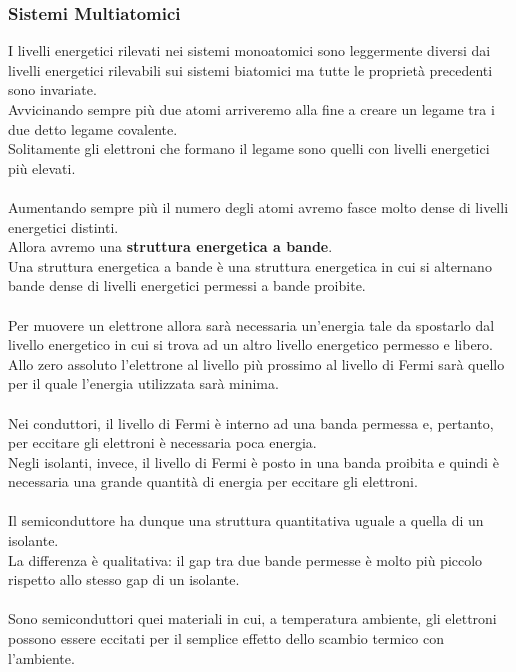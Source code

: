 \documentclass[../main.tex]{subfiles}
\begin{document}
	\subsubsection{Sistemi Multiatomici}
	I livelli energetici rilevati nei sistemi monoatomici sono leggermente diversi dai livelli energetici rilevabili sui sistemi biatomici ma tutte le proprietà precedenti sono invariate. \\
	Avvicinando sempre più due atomi arriveremo alla fine a creare un legame tra i due detto legame covalente. \\
	Solitamente gli elettroni che formano il legame sono quelli con livelli energetici più elevati.\\\\
	Aumentando sempre più il numero degli atomi avremo fasce molto dense di livelli energetici distinti. \\
	Allora avremo una \textbf{struttura energetica a bande}. \\
	Una struttura energetica a bande è una struttura energetica in cui si alternano bande dense di livelli energetici permessi a bande proibite.\\\\
	Per muovere un elettrone allora sarà necessaria un’energia tale da spostarlo dal livello energetico in cui si trova ad un altro livello energetico permesso e libero. \\
	Allo zero assoluto l’elettrone al livello più prossimo al livello di Fermi sarà quello per il quale l’energia utilizzata sarà minima.\\\\
	Nei conduttori, il livello di Fermi è interno ad una banda permessa e, pertanto, per eccitare gli elettroni è necessaria poca energia.\\ 
	Negli isolanti, invece, il livello di Fermi è posto in una banda proibita e quindi è necessaria una grande quantità di energia per eccitare gli elettroni.\\\\
	Il semiconduttore ha dunque una struttura quantitativa uguale a quella di un isolante. \\
	La differenza è qualitativa: il gap tra due bande permesse è molto più piccolo rispetto allo stesso gap di un isolante.\\\\
	Sono semiconduttori quei materiali in cui, a temperatura ambiente, gli elettroni possono essere eccitati per il semplice effetto dello scambio termico con l’ambiente. \\
\end{document}
